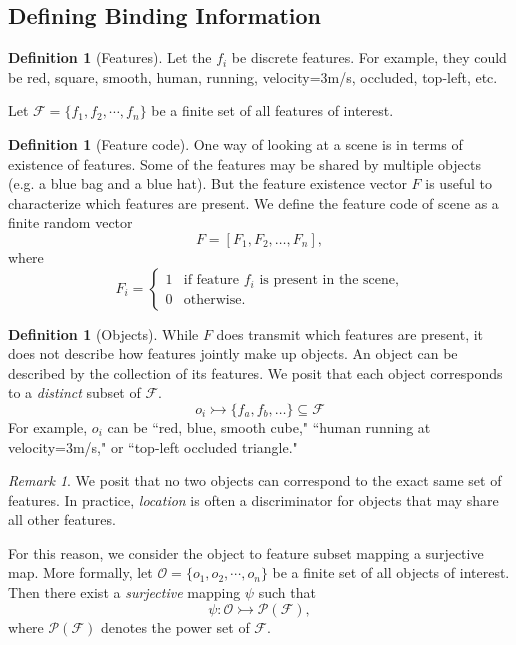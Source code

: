 \documentclass{article}
\theoremstyle{plain}
\theoremstyle{definition}
\newtheorem{definition}[theorem]{Definition}
\theoremstyle{remark}
\newtheorem{remark}[theorem]{Remark}
\begin{document}
\subsection{Defining Binding Information}
\label{definebindinginfo}
\begin{definition}[Features]
    Let the $f_i$ be discrete features. For example, they could be red, square, smooth, human, running, velocity=3m/s, occluded, top-left, etc.

Let $\mathcal{F} =\{f_1, f_2, \cdots, f_n\}$ be a finite set of all features of interest.
\label{featuredef}
\end{definition}

\begin{definition}[Feature code]

One way of looking at a scene is in terms of existence of features. Some of the features may be shared by multiple objects (e.g. a blue bag and a blue hat). But the feature existence vector $F$ is useful to characterize which features are present.
We define the feature code of scene as a finite random vector 
\[
F = [F_1, F_2, \dots, F_n],
\]
where 
\[
F_i = 
\begin{cases}
1 & \text{if feature }f_i\text{ is present in the scene,} \\
0 & \text{otherwise.}
\end{cases}
\]
\end{definition}

\begin{definition}[Objects]
    While $F$ does transmit which features are present, it does not describe how features jointly make up objects. An object can be described by the collection of its features. We posit that each object corresponds to a \emph{distinct} subset of $\mathcal{F}$.
    \[
    o_i\rightarrowtail \{f_a, f_b, \dots\} \subseteq \mathcal{F}
    \]
    For example, $o_i$ can be ``red, blue, smooth cube," ``human running at velocity=3m/s," or ``top-left occluded triangle."\label{object_def}
\end{definition}

\begin{remark}
    We posit that no two objects can correspond to the exact same set of features. In practice, \textit{location} is often a  discriminator for objects that may share all other features.
     
    For this reason, we consider the object to feature subset mapping a surjective map. More formally, let $\mathcal{O}=\{o_1, o_2, \cdots, o_n\}$ be a finite set of all objects of interest. Then there exist a \textit{surjective} mapping $\psi$ such that
    \[
    \psi: \mathcal{O} \rightarrowtail \mathcal{P}(\mathcal{F}),
    \]
    where $\mathcal{P}(\mathcal{F})$ denotes the power set of $\mathcal{F}$.\label{map}
\end{remark}
\end{document}
